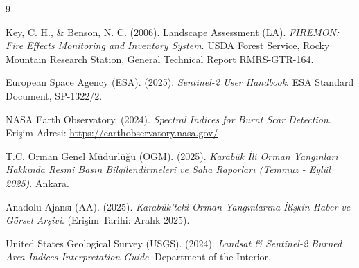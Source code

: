 \documentclass[11pt,a4paper]{article}
\begin{document}

\begin{thebibliography}{9}

Key, C. H., \& Benson, N. C. (2006).
Landscape Assessment (LA).
\textit{FIREMON: Fire Effects Monitoring and Inventory System}.
USDA Forest Service, Rocky Mountain Research Station, General Technical Report RMRS-GTR-164.

European Space Agency (ESA). (2025).
\textit{Sentinel-2 User Handbook}.
ESA Standard Document, SP-1322/2.

NASA Earth Observatory. (2024).
\textit{Spectral Indices for Burnt Scar Detection}.
Erişim Adresi: \url{https://earthobservatory.nasa.gov/}

T.C. Orman Genel Müdürlüğü (OGM). (2025).
\textit{Karabük İli Orman Yangınları Hakkında Resmi Basın Bilgilendirmeleri ve Saha Raporları (Temmuz - Eylül 2025)}.
Ankara.

Anadolu Ajansı (AA). (2025).
\textit{Karabük'teki Orman Yangınlarına İlişkin Haber ve Görsel Arşivi}.
(Erişim Tarihi: Aralık 2025).

United States Geological Survey (USGS). (2024).
\textit{Landsat \& Sentinel-2 Burned Area Indices Interpretation Guide}.
Department of the Interior.

\end{thebibliography}
\end{document}

